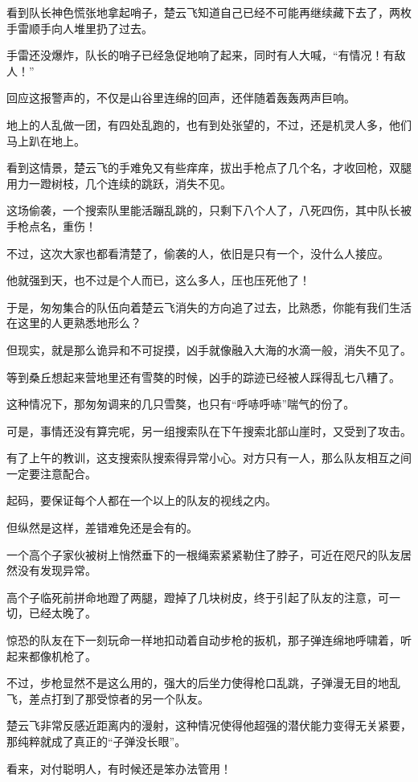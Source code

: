 看到队长神色慌张地拿起哨子，楚云飞知道自己已经不可能再继续藏下去了，两枚手雷顺手向人堆里扔了过去。

手雷还没爆炸，队长的哨子已经急促地响了起来，同时有人大喊，“有情况！有敌人！”

回应这报警声的，不仅是山谷里连绵的回声，还伴随着轰轰两声巨响。

地上的人乱做一团，有四处乱跑的，也有到处张望的，不过，还是机灵人多，他们马上趴在地上。

看到这情景，楚云飞的手难免又有些痒痒，拔出手枪点了几个名，才收回枪，双腿用力一蹬树枝，几个连续的跳跃，消失不见。

这场偷袭，一个搜索队里能活蹦乱跳的，只剩下八个人了，八死四伤，其中队长被手枪点名，重伤！

不过，这次大家也都看清楚了，偷袭的人，依旧是只有一个，没什么人接应。

他就强到天，也不过是个人而已，这么多人，压也压死他了！

于是，匆匆集合的队伍向着楚云飞消失的方向追了过去，比熟悉，你能有我们生活在这里的人更熟悉地形么？

但现实，就是那么诡异和不可捉摸，凶手就像融入大海的水滴一般，消失不见了。

等到桑丘想起来营地里还有雪獒的时候，凶手的踪迹已经被人踩得乱七八糟了。

这种情况下，那匆匆调来的几只雪獒，也只有“呼哧呼哧”喘气的份了。

可是，事情还没有算完呢，另一组搜索队在下午搜索北部山崖时，又受到了攻击。

有了上午的教训，这支搜索队搜索得异常小心。对方只有一人，那么队友相互之间一定要注意配合。

起码，要保证每个人都在一个以上的队友的视线之内。

但纵然是这样，差错难免还是会有的。

一个高个子家伙被树上悄然垂下的一根绳索紧紧勒住了脖子，可近在咫尺的队友居然没有发现异常。

高个子临死前拼命地蹬了两腿，蹬掉了几块树皮，终于引起了队友的注意，可一切，已经太晚了。

惊恐的队友在下一刻玩命一样地扣动着自动步枪的扳机，那子弹连绵地呼啸着，听起来都像机枪了。

不过，步枪显然不是这么用的，强大的后坐力使得枪口乱跳，子弹漫无目的地乱飞，差点打到了那受惊者的另一个队友。

楚云飞非常反感近距离内的漫射，这种情况使得他超强的潜伏能力变得无关紧要，那纯粹就成了真正的“子弹没长眼”。

看来，对付聪明人，有时候还是笨办法管用！

